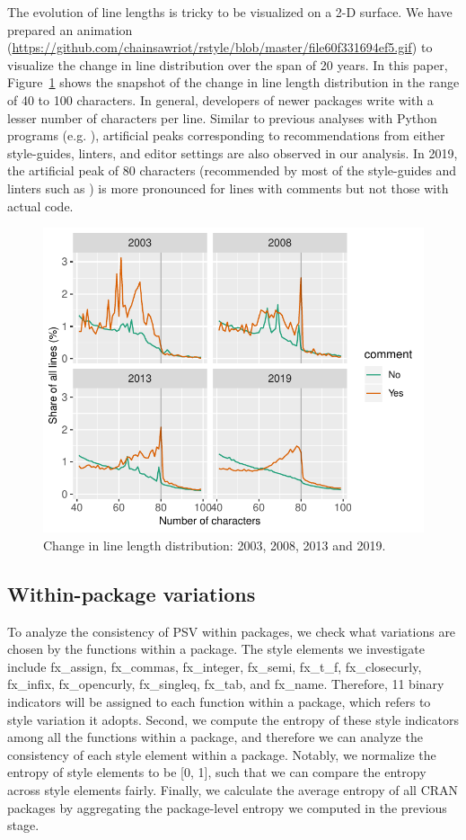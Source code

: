 The evolution of line lengths is tricky to be visualized on a 2-D surface. We have prepared an animation (\url{https://github.com/chainsawriot/rstyle/blob/master/file60f331694ef5.gif}) to visualize the change in line distribution over the span of 20 years. In this paper, Figure~\ref{figure:fig3} shows the snapshot of the change in line length distribution in the range of 40 to 100 characters. In general, developers of newer packages write with a lesser number of characters per line. Similar to previous analyses with Python programs (e.g. \citet{vanderplas}), artificial peaks corresponding to recommendations from either style-guides, linters, and editor settings are also observed in our analysis. In 2019, the artificial peak of 80 characters (recommended by most of the style-guides and linters such as ) is more pronounced for lines with comments but not those with actual code.


\begin{figure}[htbp]
  \centering
  \includegraphics{fig3}
  \caption{Change in line length distribution: 2003, 2008, 2013 and 2019.}
  \label{figure:fig3}
\end{figure}

\subsection{Within-package variations}

To analyze the consistency of PSV within packages, we check what variations are chosen by the functions within a package. The style elements we investigate include fx\_assign, fx\_commas, fx_integer, fx_semi, fx_t_f, fx_closecurly, fx_infix, fx_opencurly, fx_singleq, fx_tab, and fx_name.  
Therefore, 11 binary indicators will be assigned to each function within a package, which refers to style variation it adopts. Second, we compute the entropy of these style indicators among all the functions within a package, and therefore we can analyze the consistency of each style element within a package. Notably, we normalize the entropy of style elements to be [0, 1], such that we can compare the entropy across style elements fairly. Finally, we calculate the average entropy of all CRAN packages by aggregating the package-level entropy we computed in the previous stage. 

